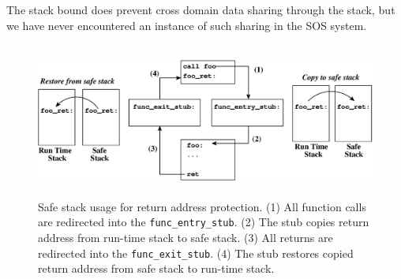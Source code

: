 The stack bound does prevent cross domain data sharing through the stack,
but we have never encountered an instance of such sharing
in the SOS system.
%


%
\begin{figure}[htbp]
   \centering
   \includegraphics[height=2.0in, keepaspectratio=true]{figures/safe_stack.eps} 
   \caption[Using safe stack for storing return address]{Safe stack
     usage for return address protection. (1) All function calls are redirected
     into the \texttt{func\_entry\_stub}. (2) The stub copies return
     address from run-time stack to safe stack. (3) All returns are
     redirected into the \texttt{func\_exit\_stub}. (4) The stub
     restores copied return address from safe stack to run-time stack.}
   \label{fig:safestack}
\end{figure}
%
